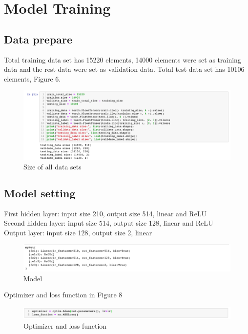 \documentclass{article}
\begin{document}
\section{Model Training}

\subsection{Data prepare}

Total training data set has 15220 elements, 14000 elements were set as training data and the rest data were set as validation data. Total test data set has 10106 elements, Figure 6.

\begin{figure}[H]
  \centering
  \includegraphics[width=1.0\textwidth]{img/Picture 5}
  \caption{Size of all data sets}
\end{figure}

\subsection{Model setting}

First hidden layer: input size 210, output size 514, linear and ReLU\\
Second hidden layer: input size 514, output size 128, linear and ReLU\\
Output layer: input size 128, output size 2, linear

\begin{figure}[H]
  \centering
  \includegraphics[width=1.0\textwidth]{img/Picture 6}
  \caption{Model}
\end{figure}

Optimizer and loss function in Figure 8

\begin{figure}[H]
  \centering
  \includegraphics[width=1.0\textwidth]{img/Picture 7}
  \caption{Optimizer and loss function }
\end{figure}
\end{document}
